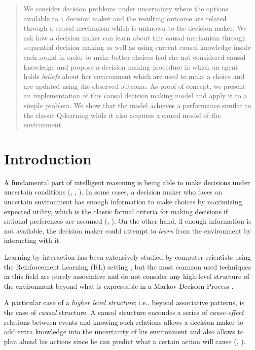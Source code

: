 \documentclass{article}
\begin{document}
\begin{abstract}
We consider decision problems under uncertainty where the options available to a decision maker and the resulting outcome are related through a causal mechanism which is unknown to the decision maker. We ask how a decision maker can learn about this causal mechanism through sequential decision making as well as using current causal knowledge inside each round in order to make better choices had she not considered causal knowledge and propose a decision making procedure in which an agent holds \textit{beliefs} about her environment which are used to make a choice and are updated using the observed outcome. As proof of concept, we present an implementation of this causal decision making model and apply it to a simple problem. We show that the model achieves a performance similar to the classic Q-learning while it also acquires a causal model of the environment. 
\end{abstract}

\section{Introduction}
A fundamental part of intelligent reasoning is being able to make decisions under uncertain conditions (\cite{danks2014unifying}, \cite{lake2017building}, \cite{pearlwhy}). In some cases, a decision maker who faces an uncertain environment has enough information to make choices by maximizing expected utility, which is the classic formal criteria for making decisions if rational preferences are assumed (\cite{bernardo2000bayesian}, \cite{gilboa2009decision}). On the other hand, if enough information is not available, the decision maker could attempt to \textit{learn} from the environment by interacting with it.

Learning by interaction has been extensively studied by computer scientists using the Reinforcement Learning (RL) setting \cite{sutton1998reinforcement}, but the most common used techniques  in this field are purely associative and do not consider any high-level structure of the environment beyond what is expressable in a Markov Decision Process \cite{garnelo2016towards}.

A particular case of a \textit{higher level structure}; i.e., beyond associative patterns, is the case of \textit{causal} structure. A causal structure encondes a series of \textit{cause-effect} relations between events and knowing such relations allows a decision maker to add extra knowledge into the uncertainty of his environment and also allows to plan ahead his actions since he can predict what a certain action will cause (\cite{spirtes2000causation}, \cite{pearl2018theoretical}).
\end{document}
